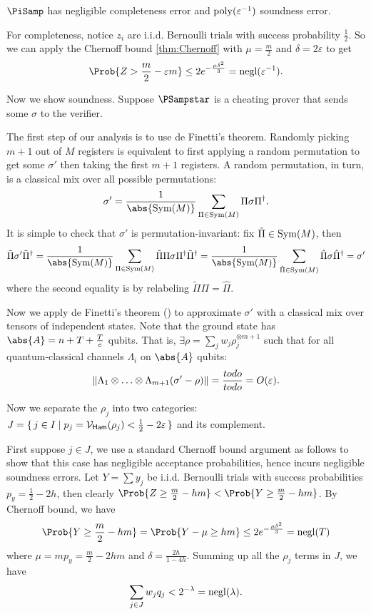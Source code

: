 \begin{thm}
    \label{QPIP1thm}
	$\PiSamp$ has negligible completeness error and $\operatorname*{\operatorname{poly}}(\varepsilon^{-1})$ soundness error.
\end{thm}
\begin{prf}
	For completeness, notice $z_i$ are i.i.d. Bernoulli trials with success probability $\frac{1}{2}$.
	So we can apply the Chernoff bound \cref{thm:Chernoff} with $\mu=\frac{m}{2}$ and $\delta=2\varepsilon$ to get
	$$\Prob{Z>\frac{m}{2}-\varepsilon m}\leq2e^{-\frac{\mu\delta^2}{3}}=\negl(\varepsilon^{-1}).$$

	Now we show soundness.
	Suppose $\PSampstar$ is a cheating prover that sends some $\sigma$ to the verifier.

	The first step of our analysis is to use de Finetti's theorem.
	Randomly picking $m+1$ out of $M$ registers is equivalent to first applying a random permutation to get some $\sigma'$ then taking the first $m+1$ registers.
	A random permutation, in turn, is a classical mix over all possible permutations:
	$$\sigma'=\frac{1}{\abs{\Sym(M)}}\sum_{\Pi\in\Sym(M)}\Pi\sigma\Pi^\dagger.$$
	It is simple to check that $\sigma'$ is permutation-invariant:
	fix $\tilde{\Pi}\in\operatorname{Sym}(M)$, then
	$$\tilde{\Pi}\sigma'\tilde{\Pi}^\dagger
	=\frac{1}{\abs{\Sym(M)}}\sum_{\Pi\in\Sym(M)}\tilde{\Pi}\Pi\sigma\Pi^\dagger\tilde{\Pi}^\dagger
	=\frac{1}{\abs{\Sym(M)}}\sum_{\hat{\Pi}\in\Sym(M)}\hat{\Pi}\sigma\hat{\Pi}^\dagger
	=\sigma'$$
	where the second equality is by relabeling $\tilde{\Pi}\Pi=\hat{\Pi}$.

	Now we apply de Finetti's theorem () to approximate $\sigma'$ with a classical mix over tensors of independent states.
	Note that the ground state has $\abs{A}=n+T+\frac{T}{e}$ qubits.
	That is, $\exists\rho=\sum_j w_j\rho_j^{\otimes m+1}$ such that for all quantum-classical channels $\Lambda_i$ on $\abs{A}$ qubits:
	$$\left\lVert\Lambda_1\otimes\ldots\otimes\Lambda_{m+1}(\sigma'-\rho)\right\rVert=\frac{todo}{todo}=O(\varepsilon).$$

	Now we separate the $\rho_j$ into two categories: $J=\set{j\in I|p_j=\mathcal{V}_{\mathsf{Ham}}(\rho_j)<\frac{1}{2}-2\varepsilon}$ and its complement.

	First suppose $j\in J$, we use a standard Chernoff bound argument as follows to show that this case has negligible acceptance probabilities,
	hence incurs negligible soundness errors.
	Let $Y=\sum y_j$ be i.i.d. Bernoulli trials with success probabilities $p_y=\frac{1}{2}-2h$,
	then clearly $\Prob{Z\geq\frac{m}{2}-hm}<\Prob{Y\geq\frac{m}{2}-hm}$.
	By Chernoff bound, we have
	$$\Prob{Y\geq\frac{m}{2}-hm}=\Prob{Y-\mu\geq hm}\leq2e^{-\frac{\mu\delta^2}{3}}=\negl(T)$$
	where $\mu=mp_y=\frac{m}{2}-2hm$ and $\delta=\frac{2h}{1-4h}$.
	Summing up all the $\rho_j$ terms in $J$, we have
	$$\sum_{j\in J} w_j q_j<2^{-\lambda}=\operatorname{negl}(\lambda).$$


\end{prf}
